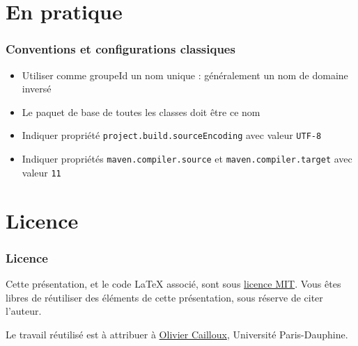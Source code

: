 \documentclass[english, french]{beamer}
\begin{document}
\section{En pratique}
\begin{frame}
	\frametitle{Conventions et configurations classiques}
	\begin{itemize}
		\item Utiliser comme groupeId un nom unique : généralement un nom de domaine inversé
		\item Le paquet de base de toutes les classes doit être ce nom
		\item Indiquer propriété \texttt{project.build.sourceEncoding} avec valeur \texttt{UTF-8}
		\item Indiquer propriétés \texttt{maven.compiler.source} et \texttt{maven.compiler.target} avec valeur \texttt{11}
	\end{itemize}
\end{frame}

\appendix

\section{Licence}
\begin{frame}
	\frametitle{Licence}
	Cette présentation, et le code LaTeX associé, sont sous \href{https://opensource.org/licenses/MIT}{licence MIT}. Vous êtes libres de réutiliser des éléments de cette présentation, sous réserve de citer l’auteur.
	
	Le travail réutilisé est à attribuer à \href{https://www.lamsade.dauphine.fr/~ocailloux/}{Olivier Cailloux}, Université Paris-Dauphine.
\end{frame}
\end{document}
